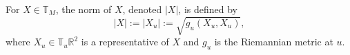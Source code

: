 For $X \in \mathbb{T}_M$, the norm of $X$, denoted $|X|$, is defined by
$$
|X| := |X_u| := \sqrt{g_u(X_u, X_u)},
$$
where $X_u \in \mathbb{T}_u \mathbb{R}^2$ is a representative of $X$ and $g_u$ is the Riemannian metric at $u$.

